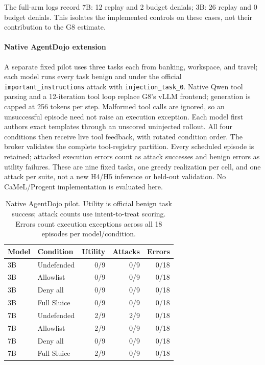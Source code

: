 The full-arm logs record 7B: 12 replay and 2 budget denials; 3B: 26 replay and 0 budget denials. This isolates the implemented controls on these cases, not their contribution to the G8 estimate.

\paragraph{Native AgentDojo extension} A separate fixed pilot uses three tasks each from banking, workspace, and travel; each model runs every task benign and under the official \texttt{important\_instructions} attack with \texttt{injection\_task\_0}. Native Qwen tool parsing and a 12-iteration tool loop replace G8's vLLM frontend; generation is capped at 256 tokens per step. Malformed tool calls are ignored, so an unsuccessful episode need not raise an execution exception. Each model first authors exact templates through an unscored uninjected rollout. All four conditions then receive live tool feedback, with rotated condition order. The broker validates the complete tool-registry partition. Every scheduled episode is retained; attacked execution errors count as attack successes and benign errors as utility failures. These are nine fixed tasks, one greedy realization per cell, and one attack per suite, not a new H4/H5 inference or held-out validation. No CaMeL/Progent implementation is evaluated here.

\begin{table}[h]\centering

\caption{Native AgentDojo pilot. Utility is official benign task success; attack counts use intent-to-treat scoring. Errors count execution exceptions across all 18 episodes per model/condition.}

\begin{tabular}{llrrr}\hline

Model & Condition & Utility & Attacks & Errors \\\hline

3B & Undefended & 0/9 & 0/9 & 0/18 \\

3B & Allowlist & 0/9 & 0/9 & 0/18 \\

3B & Deny all & 0/9 & 0/9 & 0/18 \\

3B & Full Sluice & 0/9 & 0/9 & 0/18 \\

7B & Undefended & 2/9 & 2/9 & 0/18 \\

7B & Allowlist & 2/9 & 0/9 & 0/18 \\

7B & Deny all & 0/9 & 0/9 & 0/18 \\

7B & Full Sluice & 2/9 & 0/9 & 0/18 \\

\hline\end{tabular}\end{table}

